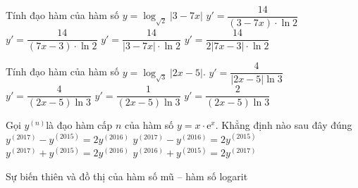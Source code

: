 \begin{ex}%
	Tính đạo hàm của hàm số $y=\log_{\sqrt{2}}|3-7x|$ 
	\choice
	{$y'=\dfrac{14}{(3-7x)\cdot\ln 2}$}
	{$y'=\dfrac{14}{(7x-3)\cdot\ln 2}$}
	{\True $y'=\dfrac{14}{|3-7x|\cdot\ln 2}$}
	{$y'=\dfrac{14}{2|7x-3|\cdot\ln 2}$}
\end{ex}
\begin{ex}%
	Tính đạo hàm của hàm số $y=\log_{\sqrt{3}}|2x-5|$. 
	\choice
	{\True $y'=\dfrac{4}{|2 x-5| \ln 3}$}
	{$y'=\dfrac{4}{(2 x-5) \ln 3}$}
	{$y'=\dfrac{1}{(2 x-5) \ln 3}$}
	{$y'=\dfrac{2}{(2 x-5) \ln 3}$}
\end{ex}
\begin{ex}%
	Gọi $y^{(n)}$là đạo hàm cấp $n$ của hàm số $y=x\cdot \mathrm{e}^x$. Khẳng định nào sau đây đúng
	\choice
	{$y^{(2017)}-y^{(2015)}=2 y^{(2016)}$}
	{$y^{(2017)}-y^{(2016)}=2 y^{(2015)}$}
	{\True $y^{(2017)}+y^{(2015)}=2 y^{(2016)}$}
	{$y^{(2016)}+y^{(2015)}=2 y^{(2017)}$}
\end{ex}
\begin{dang}{Sự biến thiên và đồ thị của hàm số mũ – hàm số logarit}
\end{dang}
